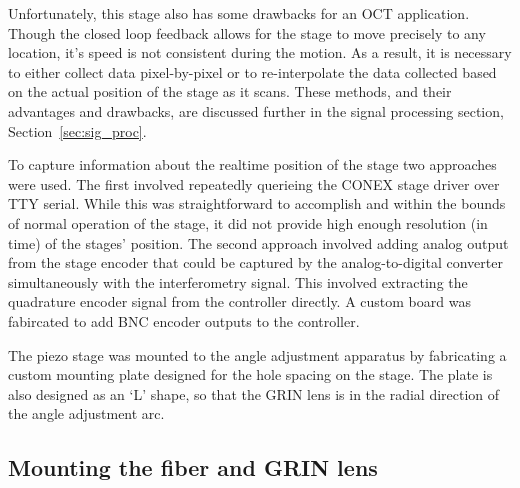 Unfortunately, this stage also has some drawbacks for an OCT application. Though the closed loop feedback allows for the stage to move precisely to any location, it's speed is not consistent during the motion. As a result, it is necessary to either collect data pixel-by-pixel or to re-interpolate the data collected based on the actual position of the stage as it scans. These methods, and their advantages and drawbacks, are discussed further in the signal processing section, Section~\ref{sec:sig_proc}.

To capture information about the realtime position of the stage two approaches were used. The first involved repeatedly querieing the CONEX stage driver over TTY serial. While this was straightforward to accomplish and within the bounds of normal operation of the stage, it did not provide high enough resolution (in time) of the stages' position. The second approach involved adding analog output from the stage encoder that could be captured by the analog-to-digital converter simultaneously with the interferometry signal. This involved extracting the quadrature encoder signal from the controller directly. A custom board was fabircated to add BNC encoder outputs to the controller.

The piezo stage was mounted to the angle adjustment apparatus by fabricating a custom mounting plate designed for the hole spacing on the stage. The plate is also designed as an `L' shape, so that the GRIN lens is in the radial direction of the angle adjustment arc.


\subsection{Mounting the fiber and GRIN lens}

